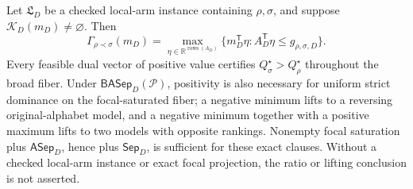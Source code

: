 Let \(\mathfrak L_D\) be a checked local-arm instance containing \(\rho,\sigma\), and suppose \(\mathcal K_D(m_D)\ne\varnothing\).  Then
\[
\Gamma_{\rho\prec\sigma}(m_D)=
\max_{\eta\in\mathbb R^{\operatorname{rows}(A_D)}}
\{m_D^{\mathsf T}\eta:A_D^{\mathsf T}\eta\le g_{\rho,\sigma,D}\}.
\]
Every feasible dual vector of positive value certifies \(Q_\sigma^\star>Q_\rho^\star\) throughout the broad fiber.  Under \(\mathsf{BASep}_D(\mathcal P)\), positivity is also necessary for uniform strict dominance on the focal-saturated fiber; a negative minimum lifts to a reversing original-alphabet model, and a negative minimum together with a positive maximum lifts to two models with opposite rankings.  Nonempty focal saturation plus \(\mathsf{ASep}_D\), hence plus \(\mathsf{Sep}_D\), is sufficient for these exact clauses.  Without a checked local-arm instance or exact focal projection, the ratio or lifting conclusion is not asserted.